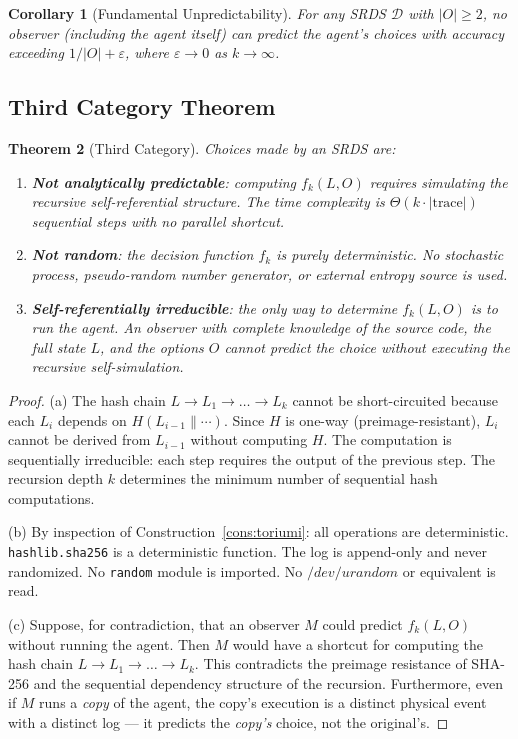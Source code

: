 \documentclass[12pt,a4paper]{article}
\newtheorem{theorem}{Theorem}[section]
\newtheorem{corollary}[theorem]{Corollary}
\theoremstyle{definition}
\theoremstyle{remark}
\newcommand{\cD}{\mathcal{D}}
\begin{document}
\begin{corollary}[Fundamental Unpredictability]
For any SRDS $\cD$ with $|O| \geq 2$, no observer (including the agent itself)
can predict the agent's choices with accuracy exceeding $1/|O| + \varepsilon$,
where $\varepsilon \to 0$ as $k \to \infty$.
\end{corollary}

\subsection{Third Category Theorem}

\begin{theorem}[Third Category]\label{thm:third}
Choices made by an SRDS are:
\begin{enumerate}[label=(\alph*), itemsep=0pt]
\item \textbf{Not analytically predictable}: computing $f_k(L, O)$ requires
  simulating the recursive self-referential structure. The time complexity is
  $\Theta(k \cdot |\text{trace}|)$ sequential steps with no parallel shortcut.
\item \textbf{Not random}: the decision function $f_k$ is purely deterministic.
  No stochastic process, pseudo-random number generator, or external entropy
  source is used.
\item \textbf{Self-referentially irreducible}: the only way to determine
  $f_k(L, O)$ is to run the agent. An observer with complete knowledge of
  the source code, the full state $L$, and the options $O$ cannot predict
  the choice without executing the recursive self-simulation.
\end{enumerate}
\end{theorem}

\begin{proof}
(a) The hash chain $L \to L_1 \to \ldots \to L_k$ cannot be short-circuited
because each $L_i$ depends on $H(L_{i-1} \parallel \cdots)$. Since $H$ is
one-way (preimage-resistant), $L_i$ cannot be derived from $L_{i-1}$ without
computing $H$. The computation is sequentially irreducible: each step requires
the output of the previous step. The recursion depth $k$ determines the
minimum number of sequential hash computations.

(b) By inspection of Construction~\ref{cons:toriumi}: all operations are
deterministic. \texttt{hashlib.sha256} is a deterministic function. The
log is append-only and never randomized. No \texttt{random} module is imported.
No $/dev/urandom$ or equivalent is read.

(c) Suppose, for contradiction, that an observer $M$ could predict
$f_k(L, O)$ without running the agent. Then $M$ would have a shortcut for
computing the hash chain $L \to L_1 \to \ldots \to L_k$. This contradicts the
preimage resistance of SHA-256 and the sequential dependency structure of the
recursion. Furthermore, even if $M$ runs a \emph{copy} of the agent, the copy's
execution is a distinct physical event with a distinct log --- it predicts the
\emph{copy's} choice, not the original's.
\end{proof}
\end{document}
